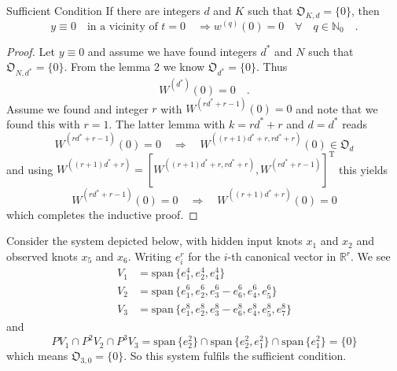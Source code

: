 \begin{proposition}{Sufficient Condition}{}
	If there are integers $d$ and $K$ such that $\mathfrak{O}_{K,d} = \{0\}$, then
	\begin{equation}
	y\equiv 0 \quad \text{in a vicinity of $t=0$} \quad 
	\Rightarrow w^{(q)}(0) = 0 \quad \forall \quad q\in\mathbb{N}_0 \quad .
	\end{equation}
\end{proposition}
\begin{proof}
	Let $y\equiv 0$ and assume we have found integers $d^*$ and $N$ such that 
	$\mathfrak{O}_{N,d^*}=\{0\}$. From the lemma 2 we know $\mathfrak{O}_{d^*}=\{0\}$. 
	Thus
	\begin{equation}
	W^{(d^*)}(0) = 0 \quad .
	\end{equation}
	Assume we found and integer $r$ with $W^{(rd^*+r-1)}(0)=0$ and note that we found this 
	with $r=1$. The latter lemma with $k=rd^*+r$ and $d=d^*$ reads
	\begin{equation}
	W^{(rd^*+r-1)}(0)=0 \quad  \Rightarrow \quad W^{((r+1)d^*+r,rd^*+r)}(0) 
	\in\mathfrak{O}_d
	\end{equation}	
	and using $W^{((r+1)d^*+r)} =\left[W^{((r+1)d^*+r,rd^*+r)},
	W^{(rd^*+r-1)}\right]^\text{T}$ this yields
	\begin{equation}
	W^{(rd^*+r-1)}(0)=0 \quad \Rightarrow \quad W^{((r+1)d^*+r)}(0)=0 
	\end{equation}
	which completes the inductive proof.
\end{proof}


\begin{example}{}{}
	Consider the system depicted below,
	with hidden input knots $x_1$ and $x_2$ and observed knots $x_5$ and $x_6$. Writing 
	$e_i^r$ for the $i$-th canonical vector in $\mathbb{R}^r$.
	We see 
	\begin{align}
	V_1 &= \text{span}\, \{ e_1^4 , e_2^4,e_4^4 \} \\
	V_2 &= \text{span}\, \{ e_1^6 , e_2^6, e_3^6-e_6^6,e_4^6,e_5^6 \} \\
	V_3 &= \text{span}\, \{ e_1^8,e_2^8,e_3^8-e_6^8,e_4^8,e_5^8,e_7^8 \}
	\end{align}
	and
	\begin{equation}
	PV_1 \cap P^2V_2 \cap P^3V_3 = \text{span}\, \{ e_2^2 \} \cap 
	\text{span}\, \{ e_2^2,e_1^2 \} \cap 
	 \text{span}\, \{e_1^2 \} = \{0\}
	\end{equation}
	which means $\mathfrak{O}_{3,0}=\{0\}$. So this system fulfils the sufficient condition.
	
\end{example}

